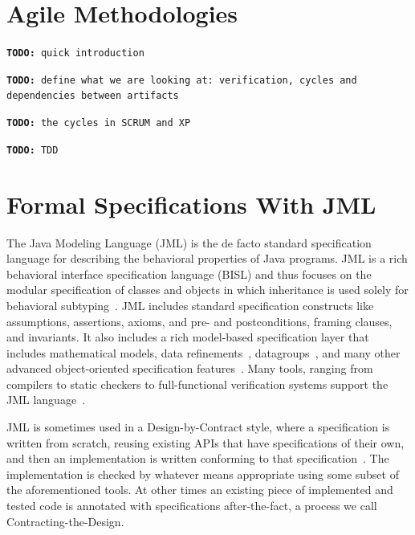 \documentclass{article} \usepackage{times}
\newcommand{\todo}[1]{\texttt{\textbf{TODO:} #1}}
\begin{document}
\section{Agile Methodologies}
\label{sec:agile_methodologies}

\todo{quick introduction}

\todo{define what we are looking at: verification, cycles and dependencies between artifacts}

\todo{the cycles in SCRUM and XP}

\todo{TDD}



\section{Formal Specifications With JML}
\label{sec:formal_specifications_using_jml}

The Java Modeling Language (JML) is the de facto standard specification language for describing the behavioral properties of Java programs.  JML is a rich behavioral interface specification language (BISL) and thus focuses on the modular specification of classes and objects in which inheritance is used solely for behavioral subtyping~\cite{X}.   JML includes standard specification constructs like assumptions, assertions, axioms, and pre- and postconditions, framing clauses, and invariants.  It also includes a rich model-based specification layer that includes mathematical models, data refinements~\cite{X}, datagroups~\cite{X}, and many other advanced object-oriented specification features~\cite{advancedJMLpaper}.  Many tools, ranging from compilers to static checkers to full-functional verification systems support the JML language~\cite{STTTpaper}.

JML is sometimes used in a Design-by-Contract style, where a specification is written from scratch, reusing existing APIs that have specifications of their own, and then an implementation is written conforming to that specification~\cite{DBCjml,DBC}.  The implementation is checked by whatever means appropriate using some subset of the aforementioned tools.  At other times an existing piece of implemented and tested code is annotated with specifications after-the-fact, a process we call Contracting-the-Design.
\end{document}
